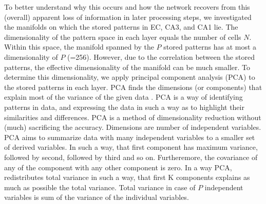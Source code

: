 \documentclass[utf8]{frontiersSCNS} %
\begin{document}
To better understand why this occurs and how the network recovers from this (overall) apparent loss of information in later processing steps, we investigated the manifolds on which the stored patterns in EC, CA3, and CA1 lie. The dimensionality of the pattern space in each layer equals the number of cells $N$. Within this space, the manifold spanned by the $P$ stored patterns has at most a dimensionality of $P$ (=256). However, due to the correlation between the stored patterns, the effective dimensionality of the manifold can be much smaller. To determine this dimensionality, we apply principal component analysis (PCA) to the stored patterns in each layer. PCA finds the dimensions (or components) that explain most of the variance of the given data \citep[chapter 4]{Hastie2009}.
%
PCA is a way of identifying patterns in data, and expressing the data in such a way as to highlight their similarities and differences.
%
PCA is a method of dimensionality reduction without (much) sacrificing the accuracy. Dimensions are number of independent variables. PCA aims to summarize data with many independent variables to a smaller set of derived variables. In such a way, that first component has maximum variance, followed by second, followed by third and so on. Furtheremore, the covariance of any of the component with any other component is zero.
In a way PCA, redistributes total variance in such a way, that first K components explains as much as possible the total variance. Total variance in case of $P$ independent variables is sum of the variance of the individual variables.
\end{document}
